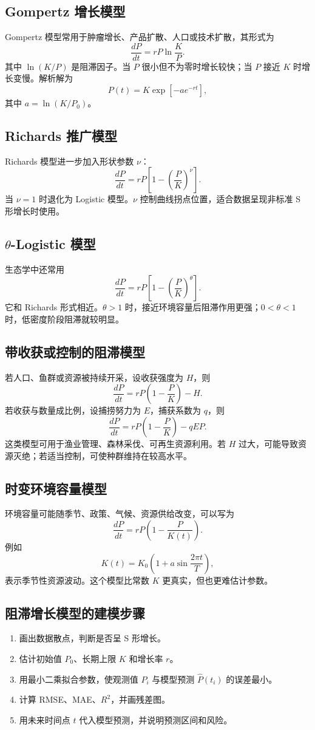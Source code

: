 \documentclass[11pt,a4paper]{ctexart}
\begin{document}
\subsection{Gompertz 增长模型}
Gompertz 模型常用于肿瘤增长、产品扩散、人口或技术扩散，其形式为
\[
\frac{dP}{dt}=rP\ln\frac{K}{P}.
\]
其中 $\ln(K/P)$ 是阻滞因子。当 $P$ 很小但不为零时增长较快；当 $P$ 接近 $K$ 时增长变慢。解析解为
\[
P(t)=K\exp\left[-a e^{-rt}\right],
\]
其中 $a=\ln(K/P_0)$。

\subsection{Richards 推广模型}
Richards 模型进一步加入形状参数 $\nu$：
\[
\frac{dP}{dt}=rP\left[1-\left(\frac{P}{K}\right)^\nu\right].
\]
当 $\nu=1$ 时退化为 Logistic 模型。$\nu$ 控制曲线拐点位置，适合数据呈现非标准 S 形增长时使用。

\subsection{$\theta$-Logistic 模型}
生态学中还常用
\[
\frac{dP}{dt}=rP\left[1-\left(\frac{P}{K}\right)^\theta\right].
\]
它和 Richards 形式相近。$\theta>1$ 时，接近环境容量后阻滞作用更强；$0<\theta<1$ 时，低密度阶段阻滞就较明显。

\subsection{带收获或控制的阻滞模型}
若人口、鱼群或资源被持续开采，设收获强度为 $H$，则
\[
\frac{dP}{dt}=rP\left(1-\frac{P}{K}\right)-H.
\]
若收获与数量成比例，设捕捞努力为 $E$，捕获系数为 $q$，则
\[
\frac{dP}{dt}=rP\left(1-\frac{P}{K}\right)-qEP.
\]
这类模型可用于渔业管理、森林采伐、可再生资源利用。若 $H$ 过大，可能导致资源灭绝；若适当控制，可使种群维持在较高水平。

\subsection{时变环境容量模型}
环境容量可能随季节、政策、气候、资源供给改变，可以写为
\[
\frac{dP}{dt}=rP\left(1-\frac{P}{K(t)}\right).
\]
例如
\[
K(t)=K_0\left(1+a\sin\frac{2\pi t}{T}\right),
\]
表示季节性资源波动。这个模型比常数 $K$ 更真实，但也更难估计参数。

\subsection{阻滞增长模型的建模步骤}
\begin{enumerate}[itemsep=0.25em]
\item 画出数据散点，判断是否呈 S 形增长。
\item 估计初始值 $P_0$、长期上限 $K$ 和增长率 $r$。
\item 用最小二乘拟合参数，使观测值 $P_i$ 与模型预测 $\hat P(t_i)$ 的误差最小。
\item 计算 RMSE、MAE、$R^2$，并画残差图。
\item 用未来时间点 $t$ 代入模型预测，并说明预测区间和风险。
\end{enumerate}
\end{document}
